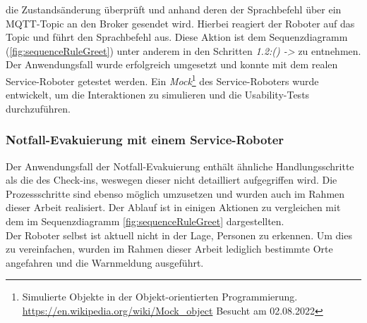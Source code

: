         die Zustandsänderung überprüft und anhand deren der Sprachbefehl über ein \acs{MQTT}-Topic an den Broker gesendet wird. Hierbei reagiert der Roboter auf das Topic und führt 
        den Sprachbefehl aus. Diese Aktion ist dem Sequenzdiagramm (\ref{fig:sequenceRuleGreet}) unter anderem in den Schritten \textit{1.2:() ->} zu entnehmen. 
        \\
        Der Anwendungsfall wurde erfolgreich umgesetzt und konnte mit dem realen Service-Roboter getestet werden. 
        Ein \textit{Mock}\footnote{Simulierte Objekte in der Objekt-orientierten Programmierung. \url{https://en.wikipedia.org/wiki/Mock_object} Besucht am 02.08.2022} 
        des Service-Roboters wurde entwickelt, um die Interaktionen zu simulieren und die Usability-Tests durchzuführen. 
    
    \subsubsection*{Notfall-Evakuierung mit einem Service-Roboter}
        Der Anwendungsfall der Notfall-Evakuierung enthält ähnliche Handlungsschritte als die des Check-ins, weswegen dieser nicht detailliert 
        aufgegriffen wird. Die Prozessschritte sind ebenso möglich umzusetzen und wurden auch im Rahmen dieser 
        Arbeit realisiert. Der Ablauf ist in einigen Aktionen zu vergleichen mit dem im Sequenzdiagramm \ref{fig:sequenceRuleGreet} dargestellten. 
        \\
        Der Roboter selbst ist aktuell nicht in der Lage, Personen zu erkennen. Um dies zu vereinfachen, wurden im Rahmen dieser Arbeit 
        lediglich bestimmte Orte angefahren und die Warnmeldung ausgeführt. 
        
